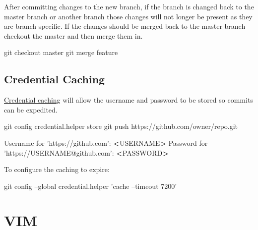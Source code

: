 \documentclass[]{book}
\newenvironment{Shaded}{\begin{snugshade}}{\end{snugshade}}
\newcommand{\ExtensionTok}[1]{#1}
\newcommand{\FunctionTok}[1]{\textcolor[rgb]{0.00,0.00,0.00}{#1}}
\newcommand{\NormalTok}[1]{#1}
\newcommand{\OperatorTok}[1]{\textcolor[rgb]{0.81,0.36,0.00}{\textbf{#1}}}
\newcommand{\StringTok}[1]{\textcolor[rgb]{0.31,0.60,0.02}{#1}}
\begin{document}
After committing changes to the new branch, if the branch is changed back to the master branch or another branch those changes will not longer be present as they are branch specific. If the changes should be merged back to the master branch checkout the master and then merge them in.

\begin{Shaded}
\begin{Highlighting}[]
\FunctionTok{git}\NormalTok{ checkout master}
\FunctionTok{git}\NormalTok{ merge feature}
\end{Highlighting}
\end{Shaded}

\hypertarget{credential-caching}{%
\section{Credential Caching}\label{credential-caching}}

\href{'https://help.github.com/articles/caching-your-github-password-in-git/\#platform-linux'}{Credential caching} will allow the username and password to be stored so commits can be expedited.

\begin{Shaded}
\begin{Highlighting}[]
\FunctionTok{git}\NormalTok{ config credential.helper store}
\FunctionTok{git}\NormalTok{ push https://github.com/owner/repo.git}

\ExtensionTok{Username}\NormalTok{ for }\StringTok{'https://github.com'}\NormalTok{: }\OperatorTok{<}\NormalTok{USERNAME}\OperatorTok{>}
\ExtensionTok{Password}\NormalTok{ for }\StringTok{'https://USERNAME@github.com'}\NormalTok{: }\OperatorTok{<}\NormalTok{PASSWORD}\OperatorTok{>}
\end{Highlighting}
\end{Shaded}

To configure the caching to expire:

\begin{Shaded}
\begin{Highlighting}[]
\FunctionTok{git}\NormalTok{ config --global credential.helper }\StringTok{'cache --timeout 7200'}
\end{Highlighting}
\end{Shaded}

\hypertarget{vim}{%
\chapter{VIM}\label{vim}}
\end{document}
